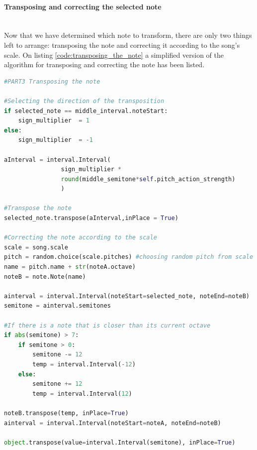 \documentclass[a4paper]{article}
\begin{document}
\paragraph{Transposing and correcting the selected note}\mbox{}\\
Now that we have determined which note to transform, there are only two things left to arrange: transposing the note and correcting it according to the song's scale. On listing \ref{code:transposing_the_note} a simplified version of the algorithm for transposing and correcting the note has been listed. 

\begin{lstlisting}[language=Python,caption={Part 3 of the simplified version of the Neighbour pitch mutation algorithm: transposing and correcting the note.},captionpos=b,label=code:transposing_the_note]
#PART3 Transposing the note

#Selecting the direction of the transposition
if selected_note == middle_interval.noteStart:
	sign_multiplier  = 1
else:
	sign_multiplier  = -1

aInterval = interval.Interval(
				sign_multiplier * 
				round(middle_semitone*self.pitch_action_strength)
				)
				
#Transpose the note
selected_note.transpose(aInterval,inPlace = True)

#Correcting the note according to the scale
scale = song.scale
pitch = random.choice(scale.pitches) #choosing random pitch from scale
name = pitch.name + str(noteA.octave)
noteB = note.Note(name)

ainterval = interval.Interval(noteStart=selected_note, noteEnd=noteB)
semitone = ainterval.semitones

#If there is a note that is closer than its current octave
if abs(semitone) > 7:
	if semitone > 0:
		semitone -= 12
		temp = interval.Interval(-12)
	else:
		semitone += 12
		temp = interval.Interval(12)

noteB.transpose(temp, inPlace=True)
ainterval = interval.Interval(noteStart=noteA, noteEnd=noteB)

object.transpose(value=interval.Interval(semitone), inPlace=True)

\end{lstlisting}
\end{document}
